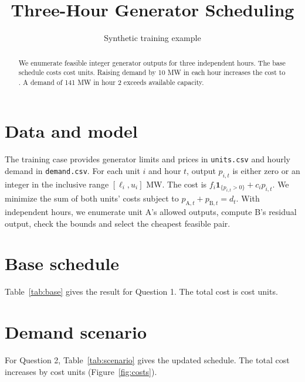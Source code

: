 \documentclass[11pt]{article}
\title{Three-Hour Generator Scheduling}
\author{Synthetic training example}
\date{}
\begin{document}
\maketitle

\begin{abstract}
We enumerate feasible integer generator outputs for three independent hours.
The base schedule costs \BaseCost{} cost units. Raising demand by 10 MW in
each hour increases the cost to \ScenarioCost{}. A demand of 141 MW in hour 2
exceeds available capacity.
\end{abstract}

\section{Data and model}
The training case provides generator limits and prices in \texttt{units.csv}
and hourly demand in \texttt{demand.csv}. For each unit \(i\) and hour \(t\),
output \(p_{i,t}\) is either zero or an integer in the inclusive range
\([\ell_i,u_i]\) MW. The cost is
\(f_i\mathbf{1}_{\{p_{i,t}>0\}}+c_i p_{i,t}\).
We minimize the sum of both units' costs subject to
\(p_{\mathrm{A},t}+p_{\mathrm{B},t}=d_t\). With independent hours, we enumerate
unit A's allowed outputs, compute B's residual output, check the bounds and
select the cheapest feasible pair.

\section{Base schedule}
Table~\ref{tab:base} gives the result for Question 1. The total cost is
\BaseCost{} cost units.

\begin{table}[ht]
\centering
\caption{Minimum-cost schedule under the original demand.}
\label{tab:base}

\end{table}

\section{Demand scenario}
For Question 2, Table~\ref{tab:scenario} gives the updated schedule.
The total cost increases by \CostIncrease{} cost units
(Figure~\ref{fig:costs}).

\begin{table}[ht]
\centering
\caption{Minimum-cost schedule with demand raised by 10 MW in each hour.}
\label{tab:scenario}

\end{table}
\end{document}
